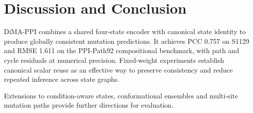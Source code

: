 \section{Discussion and Conclusion}
DiMA-PPI combines a shared four-state encoder with canonical state identity
to produce globally consistent mutation predictions. It achieves PCC 0.757
on S1129 and RMSE 1.611 on the PPI-Path92 compositional benchmark, with
path and cycle residuals at numerical precision. Fixed-weight experiments
establish canonical scalar reuse as an effective way to preserve consistency
and reduce repeated inference across state graphs.

Extensions to condition-aware states, conformational ensembles and
multi-site mutation paths provide further directions for evaluation.
